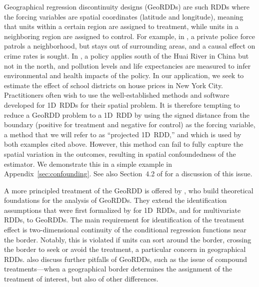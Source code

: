 \documentclass[letter]{article}
\renewcommand{\cite}[1]{\citet{#1}}
\begin{document}
    	Geographical regression discontinuity designs (GeoRDDs) are such RDDs where the forcing variables are spatial coordinates (latitude and longitude),
meaning that units within a certain region are assigned to treatment, while units in a neighboring region are assigned to control.
For example, in \cite{macdonald2015effect}, a private police force patrols a neighborhood, but stays out of surrounding areas, and a causal effect on crime rates is sought.
In \cite{chen2013evidence}, a policy applies south of the Huai River in China but not in the north, and pollution levels and life expectancies are measured to infer environmental and health impacts of the policy.
In our application, we seek to estimate the effect of school districts on house prices in New York City.
Practitioners often wish to use the well-established methods and software developed for 1D~RDDs for their spatial problem.
It is therefore tempting to reduce a GeoRDD problem to a 1D~RDD by using the signed distance from the boundary (positive for treatment and negative for control) as the forcing variable, a method that we will refer to as ``projected 1D~RDD,'' and which is used by both examples cited above.
However, this method can fail to fully capture the spatial variation in the outcomes, resulting in spatial confoundedness of the estimator.
We demonstrate this in a simple example in Appendix~\ref{sec:confounding}.
See also Section~4.2 of \cite{keele_titiunik_2015} for a discussion of this issue.
    


    	A more principled treatment of the GeoRDD is offered by \cite{keele_titiunik_2015}, who build theoretical foundations for the analysis of GeoRDDs.
They extend the identification assumptions that were first formalized by \cite{hahn2001identification} for 1D~RDDs, and \cite{imbens2011regression} for multivariate RDDs, to GeoRDDs.
The main requirement for identification of the treatment effect is two-dimensional continuity of the conditional regression functions near the border.
Notably, this is violated if units can sort around the border, crossing the border to seek or avoid the treatment, a particular concern in geographical RDDs.
\cite{keele_titiunik_2015} also discuss further pitfalls of GeoRDDs, such as the issue of compound treatments---when a geographical border determines the assignment of the treatment of interest, but also of other differences.
    
\end{document}
